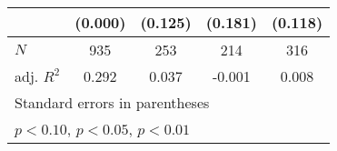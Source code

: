 {\begin{tabular}{l*{4}{c}}
            &     (0.000)         &     (0.125)         &     (0.181)         &     (0.118)         \\
\hline
\(N\)       &         935         &         253         &         214         &         316         \\
adj. \(R^{2}\)&       0.292         &       0.037         &      -0.001         &       0.008         \\
\hline\hline
\multicolumn{5}{l}{\footnotesize Standard errors in parentheses}\\
\multicolumn{5}{l}{\footnotesize \sym{*} \(p<0.10\), \sym{**} \(p<0.05\), \sym{***} \(p<0.01\)}\\
\end{tabular}
}
